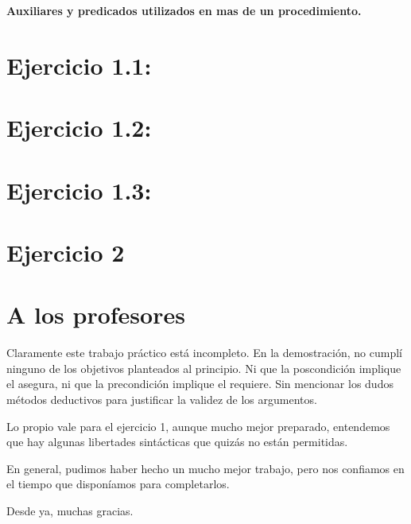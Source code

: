 \documentclass[10pt,a4paper]{article}
\begin{document}
\maketitle
\textbf{\Large{Auxiliares y predicados \small{utilizados en mas de un procedimiento.}}}\\

\section*{Ejercicio 1.1:}

\section*{Ejercicio 1.2:}

\pagebreak
\section*{Ejercicio 1.3:}

\section*{Ejercicio 2}


\section*{A los profesores}

Claramente este trabajo práctico está incompleto. En la demostración, no cumplí ninguno de los objetivos planteados al principio. Ni que la poscondición implique el asegura, ni que la precondición implique el requiere. Sin mencionar los dudos métodos deductivos para justificar la validez de los argumentos.

Lo propio vale para el ejercicio 1, aunque mucho mejor preparado, entendemos que hay algunas libertades sintácticas que quizás no están permitidas.

En general, pudimos haber hecho un mucho mejor trabajo, pero nos confiamos en el tiempo que disponíamos para completarlos.

Desde ya, muchas gracias.
\end{document}
